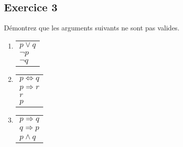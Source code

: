 \subsection*{Exercice 3}
Démontrez que les arguments suivants ne sont pas valides.

\begin{enumerate}
	\item \enter

	\begin{flushleft}
	\begin{tabular}{l}
		$p \vee q$ \\
		$\neg p$ \\
	\hline
	$\neg q$
	\end{tabular}

\end{flushleft}

	\item \enter

	\begin{flushleft}
	\begin{tabular}{l}
		$p \Leftrightarrow q$ \\
		$p \Rightarrow r$ \\
	$r$ \\
	\hline
	$p$
	\end{tabular}

\end{flushleft}


%
%

	\item \enter

	\begin{flushleft}
	\begin{tabular}{l}
		$p \Rightarrow q$ \\
		$q \Rightarrow p$ \\
	\hline
	$p \wedge q$
	\end{tabular}

\end{flushleft}

%

\end{enumerate}

